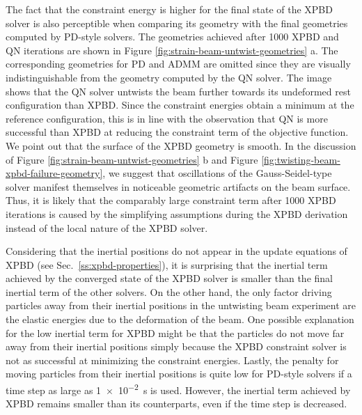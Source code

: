 The fact that the constraint energy is higher for the final state of the XPBD solver is also perceptible when comparing its geometry with the final geometries computed 
by PD-style solvers. The geometries achieved after 1000 XPBD and QN iterations are shown in Figure \ref{fig:strain-beam-untwist-geometries} a. 
The corresponding geometries for PD and ADMM are omitted since they are visually indistinguishable from the geometry computed by the QN solver. The image shows 
that the QN solver untwists the beam further towards its undeformed rest configuration than XPBD. Since the constraint energies obtain a minimum at the reference 
configuration, this is in line with the observation that QN is more successful than XPBD at reducing the constraint term of the objective function. We point out that 
the surface of the XPBD geometry is smooth. In the discussion of Figure \ref{fig:strain-beam-untwist-geometries} b and Figure \ref{fig:twisting-beam-xpbd-failure-geometry},
we suggest that oscillations of the Gauss-Seidel-type solver manifest themselves in noticeable geometric artifacts on the beam surface. Thus, it is likely that 
the comparably large constraint term after 1000 XPBD iterations is caused by the simplifying assumptions during the XPBD derivation instead of the local nature of 
the XPBD solver.

Considering that the inertial positions do not appear in the update equations of XPBD (see Sec.\ \ref{ss:xpbd-properties}), it is surprising that the inertial term achieved 
by the converged state of the XPBD solver is smaller than the final inertial term of the other solvers. On the other hand, the only factor driving particles away from 
their inertial positions in the untwisting beam experiment are the elastic energies due to the deformation of the beam. One possible explanation for the low inertial 
term for XPBD might be that the particles do not move far away from their inertial positions simply because the XPBD constraint solver is not as successful at 
minimizing the constraint energies. Lastly, the penalty for moving particles from their inertial positions is quite low for PD-style solvers if a time step as large 
as \SI{1e-2}{\second} is used. However, the inertial term achieved by XPBD remains smaller than its counterparts, even if the time step is decreased.


